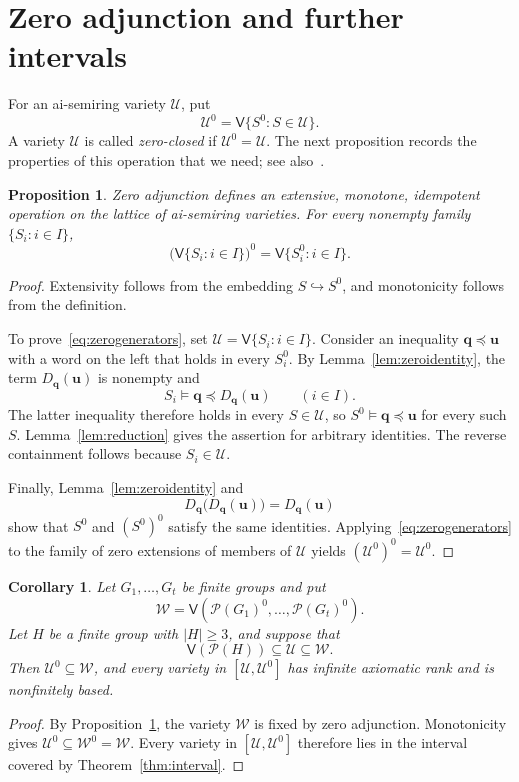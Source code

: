 \documentclass[11pt,reqno]{amsart}
\newtheorem{corollary}[theorem]{Corollary}
\newtheorem{proposition}[theorem]{Proposition}
\theoremstyle{definition}
\numberwithin{equation}{section}
\newcommand{\Pow}{\mathcal{P}}
\newcommand{\Full}[1]{\mathcal{P}(#1)^0}
\newcommand{\Var}{\mathsf{V}}
\newcommand{\bu}{\mathbf{u}}
\newcommand{\bq}{\mathbf{q}}
\newcommand{\calU}{\mathcal{U}}
\newcommand{\calW}{\mathcal{W}}
\renewcommand{\geq}{\geqslant}
\begin{document}
\section{Zero adjunction and further intervals}\label{sec:extensions}
For an ai-semiring variety $\calU$, put
\[
 \calU^0=\Var\{S^0:S\in\calU\}.
\]
A variety $\calU$ is called \emph{zero-closed} if $\calU^0=\calU$.
The next proposition records the properties of this operation that we need; see also~\cite[Corollaries~2.2 and~2.3]{grz}.

\begin{proposition}\label{prop:zerooperator}
Zero adjunction defines an extensive, monotone, idempotent operation on the lattice of ai-semiring varieties. For every nonempty family $\{S_i:i\in I\}$,
\begin{equation}\label{eq:zerogenerators}
 \bigl(\Var\{S_i:i\in I\}\bigr)^0
 =\Var\{S_i^0:i\in I\}.
\end{equation}
\end{proposition}
\begin{proof}
Extensivity follows from the embedding $S\hookrightarrow S^0$, and monotonicity follows from the definition.

To prove~\eqref{eq:zerogenerators}, set $\calU=\Var\{S_i:i\in I\}$. Consider an inequality $\bq\preceq\bu$ with a word on the left that holds in every $S_i^0$. By Lemma~\ref{lem:zeroidentity}, the term $D_{\bq}(\bu)$ is nonempty and
\[
 S_i\models\bq\preceq D_{\bq}(\bu)\qquad(i\in I).
\]
The latter inequality therefore holds in every $S\in\calU$, so $S^0\models\bq\preceq\bu$ for every such $S$. Lemma~\ref{lem:reduction} gives the assertion for arbitrary identities. The reverse containment follows because $S_i\in\calU$.

Finally, Lemma~\ref{lem:zeroidentity} and
\[
 D_{\bq}\bigl(D_{\bq}(\bu)\bigr)=D_{\bq}(\bu)
\]
show that $S^0$ and $(S^0)^0$ satisfy the same identities. Applying~\eqref{eq:zerogenerators} to the family of zero extensions of members of $\calU$ yields $(\calU^0)^0=\calU^0$.
\end{proof}

\begin{corollary}\label{cor:generalzero}
Let $G_1,\ldots,G_t$ be finite groups and put
\[
 \calW=\Var(\Full{G_1},\ldots,\Full{G_t}).
\]
Let $H$ be a finite group with $|H|\geq 3$, and suppose that
\[
 \Var(\Pow(H))\subseteq\calU\subseteq\calW.
\]
Then $\calU^0\subseteq\calW$, and every variety in $[\calU,\calU^0]$ has infinite axiomatic rank and is nonfinitely based.
\end{corollary}
\begin{proof}
By Proposition~\ref{prop:zerooperator}, the variety $\calW$ is fixed by zero adjunction. Monotonicity gives $\calU^0\subseteq\calW^0=\calW$. Every variety in $[\calU,\calU^0]$ therefore lies in the interval covered by Theorem~\ref{thm:interval}.
\end{proof}
\end{document}
